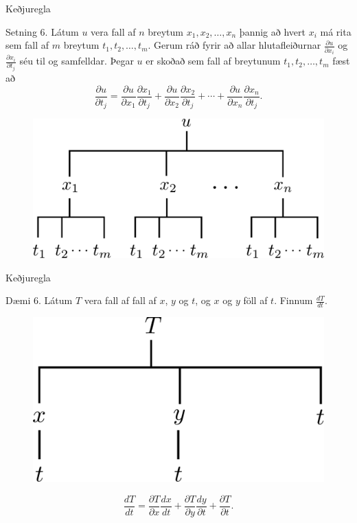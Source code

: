 \begin{frame}{Keðjuregla} 

\begin {block}{Setning 6.}
Látum $u$ vera fall af $n$ breytum $x_1, x_2, \ldots, x_n$ þannig að hvert $x_i$ má rita sem fall af $m$ breytum $t_1, t_2, \ldots, t_m$.  Gerum ráð fyrir að allar hlutafleiðurnar $\frac{\partial u}{\partial x_i}$ og $\frac{\partial x_i}{\partial t_j}$ séu til og samfelldar.  Þegar $u$ er skoðað sem fall af breytunum $t_1, t_2, \ldots, t_m$ fæst að 
$$\frac{\partial u}{\partial t_j}=
\frac{\partial u}{\partial x_1}\frac{\partial x_1}{\partial t_j}
+\frac{\partial u}{\partial x_2}\frac{\partial x_2}{\partial t_j}
+\cdots+
\frac{\partial u}{\partial x_n}\frac{\partial x_n}{\partial t_j}.$$
\end{block}
\begin{figure}[h!]
           \centering
            \includegraphics[width=0.45\linewidth]{chain3}
    \end{figure}
\end{frame}

\begin{frame}{Keðjuregla} 

\begin {block}{Dæmi 6.}
Látum $T$ vera fall af fall af $x$, $y$ og $t$, og $x$ og $y$ föll af $t$. Finnum $\frac{ dT}{dt}$.
\end {block}
\begin{figure}[h!]
           \centering
            \includegraphics[width=0.35\linewidth]{chain5}
    \end{figure}
$$\frac{d T}{d t} = \frac{\partial T}{\partial x} \frac{d x}{d t} +\frac{\partial T}{\partial y} \frac{d y}{\partial t} + \frac{\partial T}{\partial t} .$$
\end{frame}

